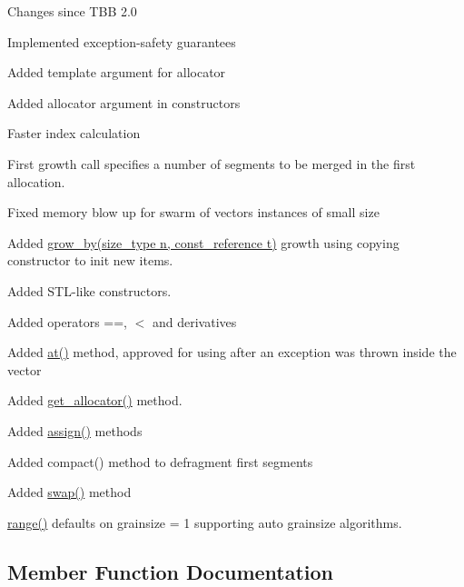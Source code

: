 \begin{DoxyParagraph}{Changes since T\+B\+B 2.0}

\begin{DoxyItemize}
\item Implemented exception-\/safety guarantees
\item Added template argument for allocator
\item Added allocator argument in constructors
\item Faster index calculation
\item First growth call specifies a number of segments to be merged in the first allocation.
\item Fixed memory blow up for swarm of vector\textquotesingle{}s instances of small size
\item Added \hyperlink{classtbb_1_1concurrent__vector_abba25587a5705b02568d0212071f0799}{grow\+\_\+by(size\+\_\+type n, const\+\_\+reference t)} growth using copying constructor to init new items.
\item Added S\+T\+L-\/like constructors.
\item Added operators ==, $<$ and derivatives
\item Added \hyperlink{classtbb_1_1concurrent__vector_a0e47a4c0a8fe53465b7c4a744601a755}{at()} method, approved for using after an exception was thrown inside the vector
\item Added \hyperlink{classtbb_1_1concurrent__vector_affc6f3b47d228af31d9bee5cead70e8d}{get\+\_\+allocator()} method.
\item Added \hyperlink{classtbb_1_1concurrent__vector_a6faee8d72aa6659a71450bb770cc7a9a}{assign()} methods
\item Added compact() method to defragment first segments
\item Added \hyperlink{classtbb_1_1concurrent__vector_ad2d9ddd0aae0dde02ce80fb66a8496f9}{swap()} method
\item \hyperlink{classtbb_1_1concurrent__vector_a6c6a75852f0619ae3ed382673abf4055}{range()} defaults on grainsize = 1 supporting auto grainsize algorithms.
\end{DoxyItemize}
\end{DoxyParagraph}


\subsection{Member Function Documentation}
\hypertarget{classtbb_1_1concurrent__vector_a1f3916a3e461f24710bb87ce40debf1c}{}
